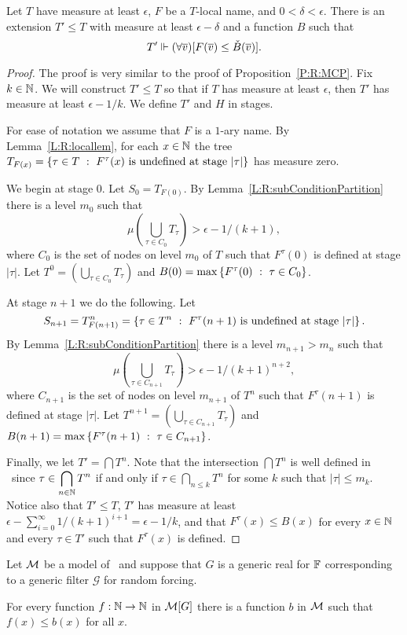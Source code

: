 \begin{thm}[\RCAo]\label{P:R:bndedNames}
Let $T$ have measure at least $\epsilon$,
$F$ be a $T$-local name, and $0<\delta<\epsilon$.
There is an extension $T'\leq T$ with measure at least $\epsilon-\delta$
and a function $B$
such that $$T' \Vdash (\forall\overline{v})[F(\overline{v}) \leq \check{B}(\overline{v})].$$
\end{thm}
\begin{proof}
The proof is very similar to the proof of Proposition~\ref{P:R:MCP}.
Fix $k\in\mathbb{N}$.
We will construct $T'\leq T$ so that if $T$ has measure
at least $\epsilon$, then $T'$ has measure at least $\epsilon-1/k$.
We define $T'$ and $H$ in stages.

For ease of notation we assume that $F$ is a $1$-ary name.
By Lemma~\ref{L:R:locallem}, for each $x\in\mathbb{N}$ the tree
$T_{F(x)}=\left\{\tau\in T\ :\ F^\tau(x)\text{ is undefined at stage }|\tau|\right\}$
has measure zero.

We begin at stage 0.
Let $S_0=T_{F(0)}$.
By Lemma~\ref{L:R:subConditionPartition} there is a level $m_0$ such that
$$\mu\left(\bigcup_{\tau\in C_0}T_\tau\right)> \epsilon-1/(k+1),$$
where $C_0$ is the set of nodes on level $m_0$ of $T$ such that
$F^\tau(0)$ is defined at stage $|\tau|$.
Let $\displaystyle T^0=\left(\bigcup_{\tau\in C_0}T_\tau\right)$ and
$B(0)=\max\left\{F^\tau(0)\ :\ \tau\in C_0\right\}$.

At stage $n+1$ we do the following.
Let
$$S_{n+1}=T^n_{F(n+1)}=\left\{\tau\in T^n\ :\ F^\tau(n+1)\text{ is undefined at stage }|\tau|\right\}.$$
By Lemma~\ref{L:R:subConditionPartition} there is a level $m_{n+1}>m_n$ such that
$$\mu\left(\bigcup_{\tau\in C_{n+1}}T_\tau\right)> \epsilon-1/(k+1)^{n+2},$$
where $C_{n+1}$ is the set of nodes on level $m_{n+1}$ of $T^n$ such that
$F^\tau(n+1)$ is defined at stage $|\tau|$.
Let $\displaystyle T^{n+1}=\left(\bigcup_{\tau\in C_{n+1}}T_\tau\right)$ and
$B(n+1)=\max\left\{F^\tau(n+1)\ :\ \tau\in C_{n+1}\right\}$.

Finally, we let $T'=\bigcap T^n$.
Note that the intersection $\bigcap T^n$ is well defined in \RCAo\
since $\displaystyle \tau\in \bigcap_{n\in\mathbb{N}} T^n$ if and only if
$\displaystyle \tau\in \bigcap_{n\leq k} T^n$ for some $k$ such that $|\tau|\leq m_k$.
Notice also that $T'\leq T$, $T'$ has measure at least
$\displaystyle \epsilon-\sum_{i=0}^\infty1/(k+1)^{i+1}=\epsilon-1/k$,
and that $F^\tau(x)\leq B(x)$ for every $x\in\mathbb{N}$ and
every $\tau\in T'$ such that $F^\tau(x)$ is defined.
\end{proof}

\begin{cor}
Let $\mathcal{M}$ be a model of \RCAo\
and suppose that $G$ is a generic real for $\mathbb{F}$
corresponding to a generic filter $\mathcal{G}$ for random forcing.

For every function $f:\mathbb{N}\to\mathbb{N}$ in $\mathcal{M}[G]$
there is a function $b$ in $\mathcal{M}$ such that
$f(x)\leq b(x)$ for all $x$.
\end{cor}
